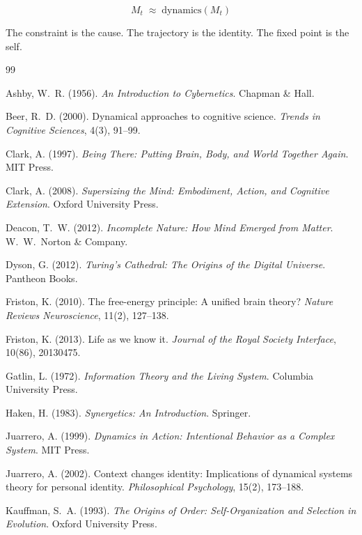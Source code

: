 \documentclass[11pt]{article}
\begin{document}
\[
\boxed{M_t \;\approx\; \mathrm{dynamics}(M_t)}
\]

The constraint is the cause. The trajectory is the identity. The fixed point is the self.

\bigskip

\begin{thebibliography}{99}

Ashby, W.~R. (1956).
\textit{An Introduction to Cybernetics}.
Chapman \& Hall.

Beer, R.~D. (2000).
Dynamical approaches to cognitive science.
\textit{Trends in Cognitive Sciences}, 4(3), 91--99.

Clark, A. (1997).
\textit{Being There: Putting Brain, Body, and World Together Again}.
MIT Press.

Clark, A. (2008).
\textit{Supersizing the Mind: Embodiment, Action, and Cognitive Extension}.
Oxford University Press.

Deacon, T.~W. (2012).
\textit{Incomplete Nature: How Mind Emerged from Matter}.
W.~W.~Norton \& Company.

Dyson, G. (2012).
\textit{Turing's Cathedral: The Origins of the Digital Universe}.
Pantheon Books.

Friston, K. (2010).
The free-energy principle: A unified brain theory?
\textit{Nature Reviews Neuroscience}, 11(2), 127--138.

Friston, K. (2013).
Life as we know it.
\textit{Journal of the Royal Society Interface}, 10(86), 20130475.

Gatlin, L. (1972).
\textit{Information Theory and the Living System}.
Columbia University Press.

Haken, H. (1983).
\textit{Synergetics: An Introduction}.
Springer.

Juarrero, A. (1999).
\textit{Dynamics in Action: Intentional Behavior as a Complex System}.
MIT Press.

Juarrero, A. (2002).
Context changes identity: Implications of dynamical systems theory for personal identity.
\textit{Philosophical Psychology}, 15(2), 173--188.

Kauffman, S.~A. (1993).
\textit{The Origins of Order: Self-Organization and Selection in Evolution}.
Oxford University Press.


\end{thebibliography}
\end{document}
